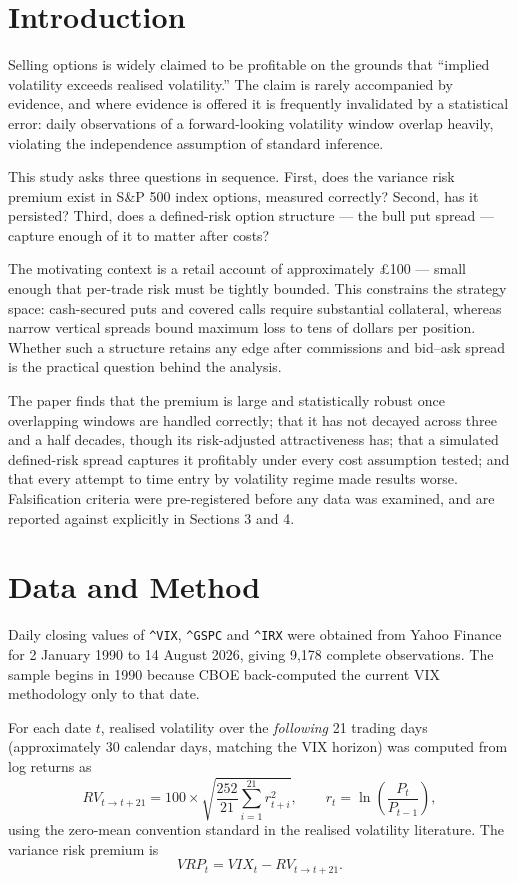 \documentclass[11pt,a4paper]{article}
\begin{document}
\section{Introduction}

Selling options is widely claimed to be profitable on the grounds that ``implied volatility exceeds
realised volatility.'' The claim is rarely accompanied by evidence, and where evidence is offered it
is frequently invalidated by a statistical error: daily observations of a forward-looking volatility
window overlap heavily, violating the independence assumption of standard inference.

This study asks three questions in sequence. First, does the variance risk premium exist in S\&P 500
index options, measured correctly? Second, has it persisted? Third, does a defined-risk option
structure --- the bull put spread --- capture enough of it to matter after costs?

The motivating context is a retail account of approximately £100 --- small enough that per-trade risk
must be tightly bounded.
This constrains the strategy space: cash-secured puts and covered calls require substantial collateral,
whereas narrow vertical spreads bound maximum loss to tens of dollars per position. Whether such a
structure retains any edge after commissions and bid--ask spread is the practical question behind the
analysis.

The paper finds that the premium is large and statistically robust once overlapping windows are handled
correctly; that it has not decayed across three and a half decades, though its risk-adjusted
attractiveness has; that a simulated defined-risk spread captures it profitably under every cost
assumption tested; and that every attempt to time entry by volatility regime made results worse.
Falsification criteria were pre-registered before any data was examined, and are reported against
explicitly in Sections 3 and 4.

\section{Data and Method}

Daily closing values of \texttt{\^{}VIX}, \texttt{\^{}GSPC} and \texttt{\^{}IRX} were obtained from
Yahoo Finance for 2 January 1990 to 14 August 2026, giving 9,178 complete observations. The sample
begins in 1990 because CBOE back-computed the current VIX methodology only to that date.

For each date $t$, realised volatility over the \emph{following} 21 trading days (approximately 30
calendar days, matching the VIX horizon) was computed from log returns as
\begin{equation}
RV_{t \rightarrow t+21} = 100 \times \sqrt{\frac{252}{21}\sum_{i=1}^{21} r_{t+i}^{2}},
\qquad r_t = \ln\!\left(\frac{P_t}{P_{t-1}}\right),
\end{equation}
using the zero-mean convention standard in the realised volatility literature. The variance risk
premium is
\begin{equation}
VRP_t = VIX_t - RV_{t \rightarrow t+21}.
\end{equation}
\end{document}
